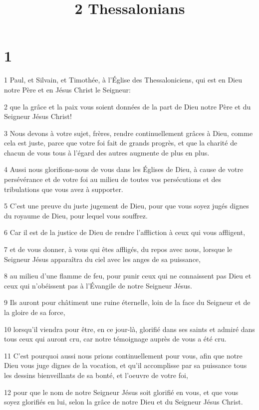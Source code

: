 

\title{2 Thessalonians}


\chapter{1}

\par 1 Paul, et Silvain, et Timothée, à l'Église des Thessaloniciens, qui est en Dieu notre Père et en Jésus Christ le Seigneur:
\par 2 que la grâce et la paix vous soient données de la part de Dieu notre Père et du Seigneur Jésus Christ!
\par 3 Nous devons à votre sujet, frères, rendre continuellement grâces à Dieu, comme cela est juste, parce que votre foi fait de grands progrès, et que la charité de chacun de vous tous à l'égard des autres augmente de plus en plus.
\par 4 Aussi nous glorifions-nous de vous dans les Églises de Dieu, à cause de votre persévérance et de votre foi au milieu de toutes vos persécutions et des tribulations que vous avez à supporter.
\par 5 C'est une preuve du juste jugement de Dieu, pour que vous soyez jugés dignes du royaume de Dieu, pour lequel vous souffrez.
\par 6 Car il est de la justice de Dieu de rendre l'affliction à ceux qui vous affligent,
\par 7 et de vous donner, à vous qui êtes affligés, du repos avec nous, lorsque le Seigneur Jésus apparaîtra du ciel avec les anges de sa puissance,
\par 8 au milieu d'une flamme de feu, pour punir ceux qui ne connaissent pas Dieu et ceux qui n'obéissent pas à l'Évangile de notre Seigneur Jésus.
\par 9 Ils auront pour châtiment une ruine éternelle, loin de la face du Seigneur et de la gloire de sa force,
\par 10 lorsqu'il viendra pour être, en ce jour-là, glorifié dans ses saints et admiré dans tous ceux qui auront cru, car notre témoignage auprès de vous a été cru.
\par 11 C'est pourquoi aussi nous prions continuellement pour vous, afin que notre Dieu vous juge dignes de la vocation, et qu'il accomplisse par sa puissance tous les dessins bienveillants de sa bonté, et l'oeuvre de votre foi,
\par 12 pour que le nom de notre Seigneur Jésus soit glorifié en vous, et que vous soyez glorifiés en lui, selon la grâce de notre Dieu et du Seigneur Jésus Christ.

